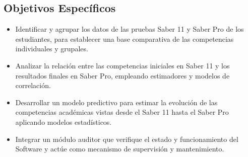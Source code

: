\subsection{Objetivos Específicos}

\begin{itemize}
	\item Identificar y agrupar los datos de las pruebas Saber 11 y Saber Pro de los estudiantes, para establecer una base comparativa de las competencias individuales y grupales.
	
	\item Analizar la relación entre las competencias iniciales en Saber 11 y los resultados finales en Saber Pro, empleando estimadores y modelos de correlación.
	
	\item Desarrollar un modelo predictivo para estimar la evolución de las competencias académicas vistas desde el Saber 11 hasta el Saber Pro aplicando modelos estadísticos.
	
	\item Integrar un módulo auditor que verifique el estado y funcionamiento del Software y actúe como mecanismo de supervisión y mantenimiento.
	
\end{itemize}

